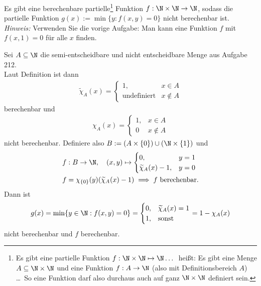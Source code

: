 
\begin{exercise}[213]

Es gibt eine berechenbare partielle\footnote{\glqq Es gibt eine partielle Funktion
$f: \N \times \N \mapsto \N \dots$\grqq\ heißt:
\glqq Es gibt eine Menge $A \subseteq \N \times \N$ und eine Funktion $f: A \to \N$
(also mit Definitionsbereich $A$) \dots\grqq\ So eine Funktion darf also durchaus
auch auf ganz $\N \times \N$ definiert sein.}
Funktion $f: \N \times \N \to \N$, sodass die partielle Funktion
$g(x) := \min\{y: f(x,y) = 0\}$ nicht berechenbar ist. \\
\textit{Hinweis:} Verwenden Sie die vorige Aufgabe: Man kann eine Funktion
$f$ mit $f(x,1) = 0$ für alle $x$ finden.

\end{exercise}


\begin{solution}

Sei $A \subseteq \N$ die semi-entscheidbare und nicht entscheidbare Menge aus Aufgabe 212. \\
Laut Definition ist dann
\begin{align*}
  \widetilde{\chi}_A(x) = \begin{cases}
    1, & x \in A \\
    \text{undefiniert} & x \notin A
  \end{cases}
\end{align*}
berechenbar und
\begin{align*}
  \chi_A(x) = \begin{cases}
    1, & x \in A \\
    0 & x \notin A
  \end{cases}
\end{align*}
nicht berechenbar. Definiere also $B := (A \times \{0\}) \cup (\N \times \{1\})$
und
\begin{align*}
  f&: B \to \N, \quad (x,y) \mapsto \begin{cases}
      0, & y = 1 \\
      \widetilde{\chi}_A(x) - 1, & y = 0
  \end{cases} \\
  f &= \chi_{\{0\}}(y)(\widetilde{\chi}_A(x) - 1) \implies f \text{ berechenbar}.
\end{align*}
Dann ist
\begin{align*}
  g(x) = \min\{y \in \N: f(x,y) = 0\} =
  \begin{cases}
      0, & \widetilde{\chi}_A(x) = 1 \\
      1, & \text{sonst}
  \end{cases}
  = 1 - \chi_A(x)
\end{align*}
nicht berechenbar und $f$ berechenbar.
\end{solution}
